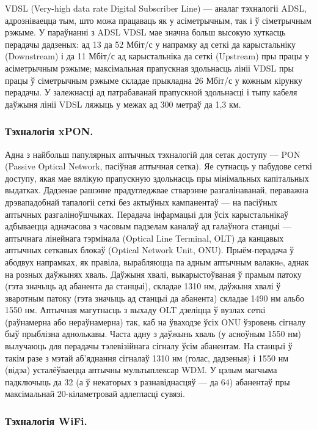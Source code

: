 VDSL (Very-high data rate Digital Subscriber Line) --- аналаг тэхналогіі ADSL, адрозніваецца тым, што можа працаваць як у асіметрычным, так і ў сіметрычным рэжыме. У параўнанні з ADSL VDSL мае значна больш высокую хуткасць перадачы дадзеных: ад 13 да 52 Мбіт/с у напрамку ад сеткі да карыстальніку (Downstream) і да 11 Мбіт/с ад карыстальніка да сеткі (Upstream) пры працы у асіметрычным рэжыме; максімальная прапускная здольнасць лініі VDSL пры працы ў сіметрычным рэжыме складае прыкладна 26 Мбіт/с у кожным кірунку перадачы. У залежнасці ад патрабаванай прапускной здольнасці і тыпу кабеля даўжыня лініі VDSL ляжыць у межах ад 300 метраў да 1,3 км.

\subsubsection{Тэхналогія xPON.}

Адна з найбольш папулярных аптычных тэхналогій для сетак доступу --- PON (Passive Optical Network, пасіўная аптычная сетка). Яе сутнасць у пабудове сеткі доступу, якая мае вялікую прапускную здольнасць пры мінімальных капітальных выдатках. Дадзенае рашэнне прадугледжвае стварэнне разгалінаванай, пераважна дрэвападобнай тапалогіі сеткі без актыўных кампанентаў --- на пасіўных аптычных разгаліноўшчыках. Перадача інфармацыі для ўсіх карыстальнікаў адбываецца адначасова з часовым падзелам каналаў ад галаўнога станцыі --- аптычнага лінейнага тэрмінала (Optical Line Terminal, OLT) да канцавых аптычных сеткавых блокаў (Optical Network Unit, ONU). Прыём-перадача ў абодвух напрамках, як правіла, вырабляюцца па адным аптычным валакнe, аднак на розных даўжынях хваль. Даўжыня хвалі, выкарыстоўваная ў прамым патоку (гэта значыць ад абанента да станцыі), складае 1310 нм, даўжыня хвалі ў зваротным патоку (гэта значыць ад станцыі да абанента) складае 1490 нм альбо 1550 нм. Аптычная магутнасць з выхаду OLT дзеліцца ў вузлах сеткі (раўнамерна або нераўнамерна) так, каб на ўваходзе ўсіх ONU ўзровень сігналу быў прыблізна аднолькавы. Часта адну з даўжынь хваль (у асноўным 1550 нм) вылучаюць для перадачы тэлевізійнага сігналу ўсім абанентам. На станцыі ў такім разе з мэтай аб'яднання сігналаў 1310 нм (голас, дадзеныя) і 1550 нм (відэа) усталёўваецца аптычны мультыплексар WDM. У цэлым магчыма падключыць да 32 (а ў некаторых з разнавіднасцяў --- да 64) абанентаў пры максімальнай 20-кіламетровай адлегласці сувязі.

\subsubsection{Тэхналогія WiFi.}

